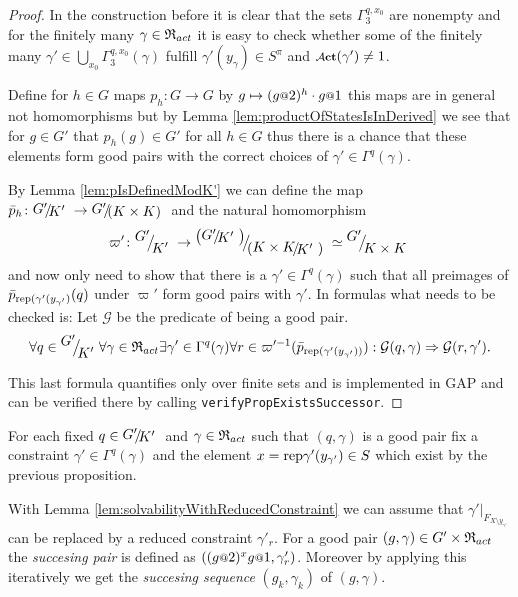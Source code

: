 \documentclass[a4paper,12pt]{article}
\begin{document}
\begin{proof}
 In the construction before it is clear that the sets $\Gamma_3^{q,x_0}$ are nonempty and for the finitely many $\gamma\in \mathfrak{R}_{act}$ it is
 easy to check whether some of the finitely many $\gamma'\in\bigcup_{x_0}\Gamma_3^{q,x_0}(\gamma)$ fulfill $\gamma'(y_\gamma) \in S^\pi$ and $\act(\gamma')\neq 1$.
 
 
  Define for $h\in G$ maps $p_h\colon G\to G$ by $g\mapsto (g\at{2})^{h}\cdot g\at{1}$ this maps are in general not homomorphisms but 
  by Lemma \ref{lem:productOfStatesIsInDerived} we see that for $g\in G'$ that $p_h(g)\in G'$ for all $h\in G$ thus there is a chance that these elements form good pairs with
  the correct choices of $\gamma' \in \Gamma^q(\gamma)$. 
 
  By Lemma \ref{lem:pIsDefinedModK'} we can define the map $\bar p_h\colon \RNK{G'}{K'} \to \RNK{G'}{(K\times K)}$
 and the natural homomorphism \[\varpi'\colon \RNK{G'}{K'} \to \RNK{\left(\RNK{G'}{K'}\right)}{\left(\RNK{K\times K}{K'}\right)} \simeq \RNK{G'}{K\times K} \]
 and now only need to show that there is a $\gamma'\in\Gamma^q(\gamma)$ such that all preimages of $\bar p_{\textup{rep}(\gamma'(y_{\gamma'})}(q)$ under $\varpi'$ 
 form good pairs with $\gamma'$. In formulas what needs to be checked is: Let $\mathcal{G}$ be the predicate of being a good pair. %
 \[\forall q\in\RNK{G'}{K'}
      \forall \gamma\in\Red_{act} 
	 \exists \gamma'\in \Gamma^q(\gamma)
	    \forall r\in \varpi'^{-1}(\bar p_{\textup{rep}(\gamma'(y_{\gamma'}))}):
	      \mathcal{G}(q,\gamma) \Rightarrow \mathcal{G}(r,\gamma').\]
 
 This last formula quantifies only over finite sets and is implemented in GAP and can be verified there by calling \lstinline{verifyPropExistsSuccessor}. 
 \end{proof}

 \begin{defi}
 For each fixed $q\in\RNK{G'}{K'}$ and $\gamma\in \mathfrak{R}_{act}$ such that $(q,\gamma)$ is a good pair
 fix a constraint $\gamma'\in\Gamma^q(\gamma)$ and the element $x=\textup{rep}\gamma'(y_{\gamma'})\in S$ which exist by the previous proposition.
 
 With Lemma \ref{lem:solvabilityWithReducedConstraint} we can assume that $\gamma'|_{F_{X\setminus y_{\gamma'}}}$ can be replaced by a reduced constraint $\gamma'_r$. 
 For a good pair $(g,\gamma)\in G'\times\mathfrak{R}_{act}$ the \emph{succesing pair} is defined as $\left((g\at{2})^xg\at{1},\gamma'_r\right)$.
 Moreover by applying this iteratively we get the \emph{succesing sequence} $(g_k,\gamma_k)$ of $(g,\gamma)$.
 \end{defi}
 
\end{document}
